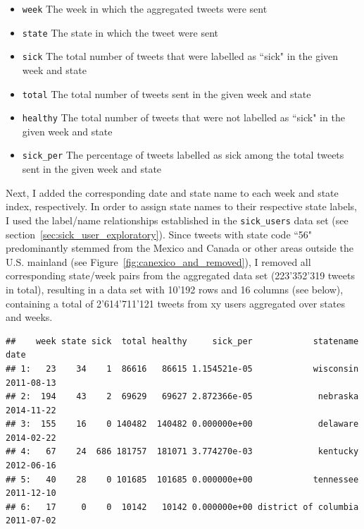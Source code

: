 \documentclass[11pt, a4paper,twoside]{report}\usepackage[]{graphicx}\usepackage[]{color}
\makeatletter
\newenvironment{kframe}{%
 \def\at@end@of@kframe{}%
 \ifinner\ifhmode%
  \def\at@end@of@kframe{\end{minipage}}%
  \begin{minipage}{\columnwidth}%
 \fi\fi%
 \def\FrameCommand##1{\hskip\@totalleftmargin \hskip-\fboxsep
 \colorbox{shadecolor}{##1}\hskip-\fboxsep
     \hskip-\linewidth \hskip-\@totalleftmargin \hskip\columnwidth}%
 \MakeFramed {\advance\hsize-\width
   \@totalleftmargin\z@ \linewidth\hsize
   \@setminipage}}%
 {\par\unskip\endMakeFramed%
 \at@end@of@kframe}
\newenvironment{knitrout}{}{} %
\makeatother
\begin{document}
\begin{itemize}
  \item \texttt{week} The week in which the aggregated tweets were sent
  \item \texttt{state} The state in which the tweet were sent
  \item \texttt{sick} The total number of tweets that were labelled as ``sick" in the given week and state
  \item \texttt{total} The total number of tweets sent in the given week and state
  \item \texttt{healthy} The total number of tweets that were not labelled as ``sick" in the given week and state
  \item \texttt{sick\_per} The percentage of tweets labelled as sick among the total tweets sent in the given week and state
\end{itemize}



Next, I added the corresponding date and state name to each week and state index, respectively. In order to assign state names to their respective state labels, I used the label/name relationships established in the \texttt{sick\_users} data set (see section~\ref{sec:sick_user_exploratory}). Since tweets with state code ``56" predominantly stemmed from the Mexico and Canada or other areas outside the U.S. mainland (see Figure~\ref{fig:canexico_and_removed}), I removed all corresponding state/week pairs from the aggregated data set (223'352'319 tweets in total), resulting in a data set with 10'192 rows and 16 columns (see below), containing a total of 2'614'711'121 tweets from xy users aggregated over states and weeks.

\begin{knitrout}
\color{fgcolor}\begin{kframe}
\begin{verbatim}
##    week state sick  total healthy     sick_per            statename       date
## 1:   23    34    1  86616   86615 1.154521e-05            wisconsin 2011-08-13
## 2:  194    43    2  69629   69627 2.872366e-05             nebraska 2014-11-22
## 3:  155    16    0 140482  140482 0.000000e+00             delaware 2014-02-22
## 4:   67    24  686 181757  181071 3.774270e-03             kentucky 2012-06-16
## 5:   40    28    0 101685  101685 0.000000e+00            tennessee 2011-12-10
## 6:   17     0    0  10142   10142 0.000000e+00 district of columbia 2011-07-02
\end{verbatim}
\end{kframe}
\end{knitrout}
\end{document}
